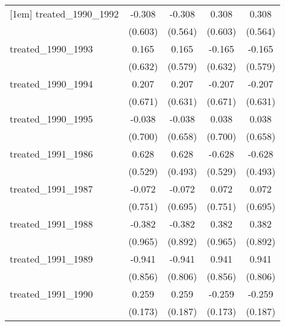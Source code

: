 {\begin{tabular}{l*{4}{c}}
[1em]
treated\_1990\_1992&      -0.308         &      -0.308         &       0.308         &       0.308         \\
            &     (0.603)         &     (0.564)         &     (0.603)         &     (0.564)         \\
[1em]
treated\_1990\_1993&       0.165         &       0.165         &      -0.165         &      -0.165         \\
            &     (0.632)         &     (0.579)         &     (0.632)         &     (0.579)         \\
[1em]
treated\_1990\_1994&       0.207         &       0.207         &      -0.207         &      -0.207         \\
            &     (0.671)         &     (0.631)         &     (0.671)         &     (0.631)         \\
[1em]
treated\_1990\_1995&      -0.038         &      -0.038         &       0.038         &       0.038         \\
            &     (0.700)         &     (0.658)         &     (0.700)         &     (0.658)         \\
[1em]
treated\_1991\_1986&       0.628         &       0.628         &      -0.628         &      -0.628         \\
            &     (0.529)         &     (0.493)         &     (0.529)         &     (0.493)         \\
[1em]
treated\_1991\_1987&      -0.072         &      -0.072         &       0.072         &       0.072         \\
            &     (0.751)         &     (0.695)         &     (0.751)         &     (0.695)         \\
[1em]
treated\_1991\_1988&      -0.382         &      -0.382         &       0.382         &       0.382         \\
            &     (0.965)         &     (0.892)         &     (0.965)         &     (0.892)         \\
[1em]
treated\_1991\_1989&      -0.941         &      -0.941         &       0.941         &       0.941         \\
            &     (0.856)         &     (0.806)         &     (0.856)         &     (0.806)         \\
[1em]
treated\_1991\_1990&       0.259         &       0.259         &      -0.259         &      -0.259         \\
            &     (0.173)         &     (0.187)         &     (0.173)         &     (0.187)         \\

\end{tabular}}
